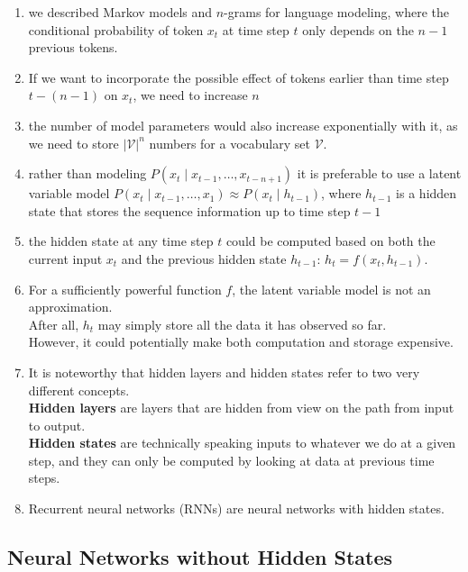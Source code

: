 \begin{enumerate}
    \item we described Markov models and $n$-grams for language modeling, where the conditional probability of token $x_t$ at time step $t$ only depends on the $n-1$ previous tokens.

    \item If we want to incorporate the possible effect of tokens earlier than time step $t - (n-1)$ on $x_t$, we need to increase $n$

    \item the number of model parameters would also increase exponentially with it, as we need to store $|\mathcal{V}|^n$ numbers for a vocabulary set $\mathcal{V}$.

    \item rather than modeling $P(x_t \mid x_{t-1}, \ldots, x_{t-n+1})$ it is preferable to use a latent variable model $P(x_t \mid x_{t-1}, \ldots, x_1) \approx P(x_t \mid h_{t-1})$, where $h_{t-1}$ is a hidden state that stores the sequence information up to time step $t-1$

    \item the hidden state at any time step $t$ could be computed based on both the current input $x_t$ and the previous hidden state $h_{t-1}$: $h_t = f(x_{t}, h_{t-1})$.

    \item For a sufficiently powerful function $f$, the latent variable model is not an approximation.\\
    After all, $h_t$ may simply store all the data it has observed so far.\\ 
    However, it could potentially make both computation and storage expensive.

    \item It is noteworthy that hidden layers and hidden states refer to two very different concepts.\\
    \textbf{Hidden layers} are layers that are hidden from view on the path from input to output.\\
    \textbf{Hidden states} are technically speaking inputs to whatever we do at a given step, and they can only be computed by looking at data at previous time steps.

    \item Recurrent neural networks (RNNs) are neural networks with hidden states.
\end{enumerate}


\subsection{Neural Networks without Hidden States \cite{dnn-1}}

